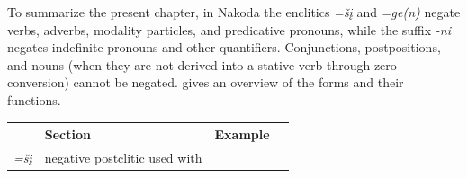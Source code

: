 \documentclass[output=paper,colorlinks,citecolor=brown]{langscibook}
\begin{document}
To summarize the present chapter, in Nakoda the enclitics  \textit{=šį} and \textit{=ge(n)} negate verbs, adverbs, modality particles, and predicative pronouns, while the suffix \textit{-ni} negates indefinite pronouns and other quantifiers. Conjunctions, postpositions, and nouns (when they are not derived into a stative verb through zero conversion) cannot be negated.  gives an overview of the forms and their functions.


\begin{table}
\begin{tabularx}{\textwidth}{lQll}

\lsptoprule

 & {  Section} & {  Example}\\
\midrule
{\itshape =šį} & { negative postclitic used with} &&\\


\end{tabularx}
\end{table}
\end{document}
